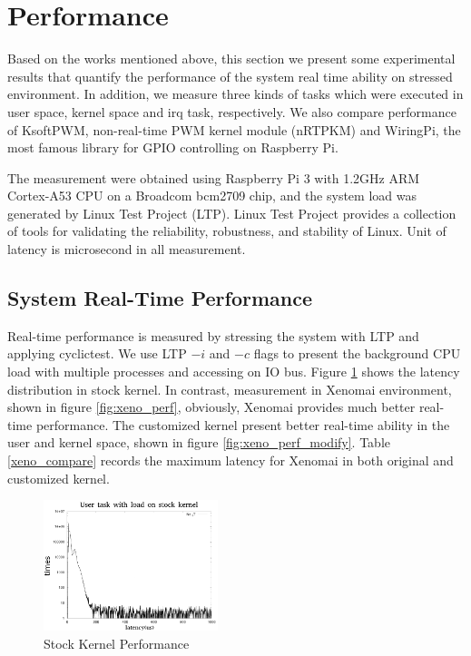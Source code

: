 \documentclass[conference]{IEEEtran}
\begin{document}
\section{Performance}

Based on the works mentioned above, this section we present some experimental results that quantify the performance of the system real time ability on stressed environment. In addition, we measure three kinds of tasks which were executed in user space, kernel space and irq task, respectively. We also compare performance of KsoftPWM, non-real-time PWM kernel module (nRTPKM) and WiringPi, the most famous library for GPIO controlling on Raspberry Pi.

	The measurement were obtained using Raspberry Pi 3 with 1.2GHz ARM Cortex-A53 CPU on a Broadcom bcm2709 chip, and the system load was generated by Linux Test Project (LTP). Linux Test Project provides a collection of tools for validating the reliability, robustness, and stability of Linux. Unit of latency is microsecond in all measurement.


\subsection{System Real-Time Performance}

Real-time performance is measured by stressing the system with LTP and applying cyclictest. We use LTP $-i$ and $-c$ flags to present the background CPU load with multiple processes and accessing on IO bus. Figure \ref{fig:stock_kernel_perf} shows the latency distribution in stock kernel. In contrast, measurement in Xenomai environment, shown in figure \ref{fig:xeno_perf}, obviously, Xenomai provides much better real-time performance. The customized kernel present better real-time ability in the user and kernel space, shown in figure \ref{fig:xeno_perf_modify}. Table \ref{xeno_compare} records the maximum latency for Xenomai in both original and customized kernel.

\begin{figure}
\centering
\includegraphics[width=2in]{img/stock_kernel.png}
\caption{Stock Kernel Performance}
\label{fig:stock_kernel_perf}
\end{figure}
\end{document}
